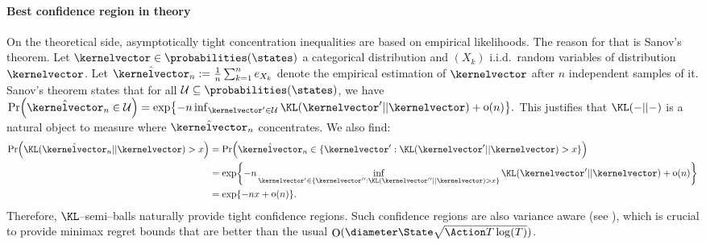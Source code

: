 \documentclass[preprint,cleveref,12pt]{colt2025}
\DeclarePairedDelimiter{\braces}{\{}{\}}	%
\DeclarePairedDelimiter{\parens}{(}{)}	%
\DeclareMathOperator*{\oh}{\mathrm{o}}
\DeclareMathOperator*{\OH}{\mathrm{O}}
\def\kernel{\kernelvector}
\begin{document}
    \paragraph{Best confidence region in theory}
    On the theoretical side, asymptotically tight concentration inequalities are based on empirical likelihoods.
    The reason for that is Sanov's theorem.
    Let $\kernel \in \probabilities(\states)$ a categorical distribution and $(X_k)$ i.i.d.~random variables of distribution $\kernel$.
    Let $\hat{\kernel}_n := \frac 1n \sum_{k=1}^n e_{X_k}$ denote the empirical estimation of $\kernel$ after $n$ independent samples of it.
    Sanov's theorem states that for all $\mathcal{U} \subseteq \probabilities(\states)$, we have
    $
        \Pr \parens*{
            \hat{\kernel}_n \in \mathcal{U}
        }
        =
        \exp \braces*{
            - n \inf_{\kernel' \in \mathcal{U}} \KL(\kernel'||\kernel)
            + \oh(n)
        }
        .
    $
    This justifies that $\KL(-||-)$ is a natural object to measure where $\hat{\kernel}_n$ concentrates.
    We also find:
    \begin{align*}
        \Pr \parens*{
            \KL(\hat{\kernel}_n||\kernel) > x
        }
        & = \Pr \parens*{
            \hat{\kernel}_n \in \braces{\kernel' : \KL(\kernel'||\kernel) > x}
        }
        \\
        & = \exp \braces*{
            - n \inf_{\kernel' \in \braces{\kernel'' : \KL(\kernel''||\kernel) > x}} \KL(\kernel'||\kernel) 
            + \oh(n)
        }
        \\
        & = \exp \braces*{
            - n x + \oh(n)
        }
        .
    \end{align*}
    Therefore, $\KL$--semi--balls naturally provide tight confidence regions. 
    Such confidence regions are also variance aware (see \cite{talebi_variance_aware_2018}), which is crucial to provide minimax regret bounds that are better than the usual $\OH(\diameter \State\sqrt{\Action T \log(T)})$.
\end{document}
